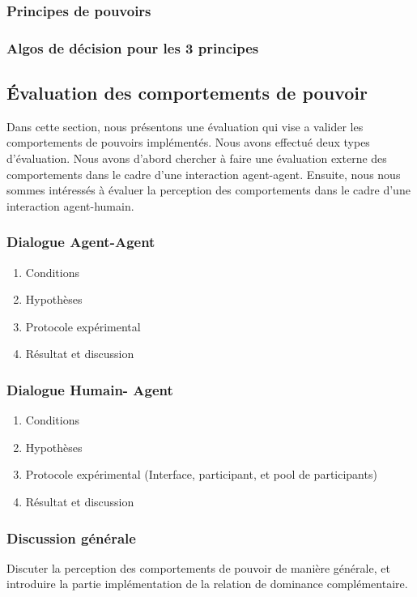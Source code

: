 \documentclass [french]{article}
\begin{document}
			\subsubsection{Principes de pouvoirs }
			
			\subsubsection{Algos de décision pour les 3 principes}
			
		\subsection{Évaluation des comportements de pouvoir}
			Dans cette section, nous présentons une évaluation qui vise a valider les comportements de pouvoirs implémentés. Nous avons effectué deux types d'évaluation. Nous avons d'abord chercher à faire une évaluation externe des comportements dans le cadre d'une interaction agent-agent.  Ensuite, nous nous sommes intéressés à évaluer la perception des comportements dans le cadre d'une interaction agent-humain. 
			
			\subsubsection{Dialogue Agent-Agent}
				\begin{enumerate}
					\item Conditions
					\item Hypothèses
					\item Protocole expérimental
					\item Résultat et discussion 
				\end{enumerate}
			\subsubsection{Dialogue Humain- Agent}
					\begin{enumerate}
						\item Conditions
						\item Hypothèses
						\item Protocole expérimental (Interface, participant, et pool de participants)
						\item Résultat et discussion 
					\end{enumerate}
					
			\subsubsection{Discussion générale}
					Discuter la perception des comportements de pouvoir de manière générale, et introduire la partie implémentation de la relation de dominance complémentaire.
\end{document}
